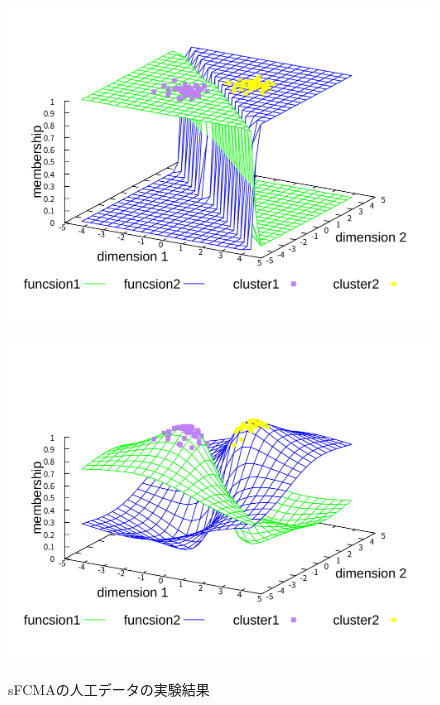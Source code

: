 \documentclass[twocolumn, a4paper]{icethesisabst}
\begin{document}
\begin{figure}[htbp]
 \centering
 \begin{minipage}{0.43\hsize}
  \includegraphics[width=\linewidth]{sFCMA-Em11.pdf}
  \label{fig:sFCMA-Em11}
 \end{minipage}
 \begin{minipage}{0.43\hsize}
  \includegraphics[width=\linewidth]{sFCMA-Em2.pdf}
  \label{fig:sFCMA-Em2}
 \end{minipage}
 \vspace*{0.5cm}
 \caption{sFCMAの人工データの実験結果}
\end{figure}
\end{document}

